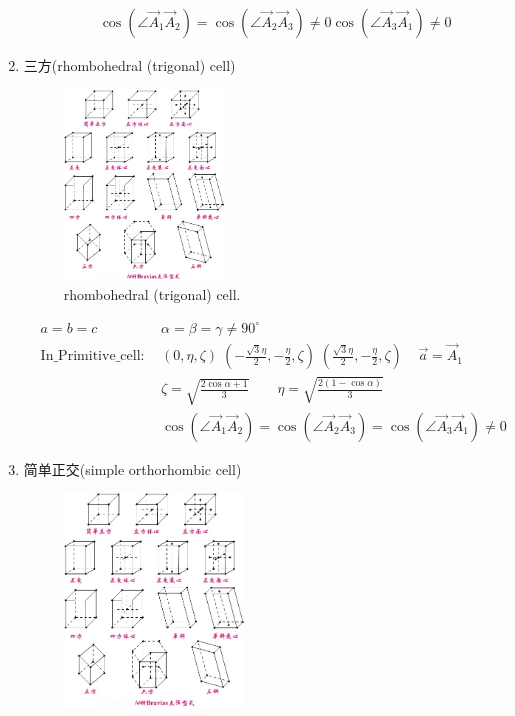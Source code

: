\documentclass{article}      %
\begin{document}
\begin{enumerate}
\begin{displaymath}
\begin{aligned}
		& &\cos(\angle\vec A_1\vec A_2)=\cos(\angle\vec A_2\vec A_3)\neq0\cos(\angle\vec A_3\vec A_1)\neq0
	\end{aligned}
\end{displaymath}
		\item 三方(\textrm{rhombohedral (trigonal) cell})
\begin{figure}[h!]
\centering
\includegraphics[width=0.4\textwidth,viewport=30 30 150 185,clip]{Bravias.jpg}
\caption{\small rhombohedral (trigonal) cell.}%
\label{Bravais:rhombohedral cell}
\end{figure}
\begin{displaymath}
	\begin{aligned}
	& a=b=c &\alpha=\beta=\gamma\neq90^{\circ}\\
	&\mathrm{In\_Primitive\_cell}:~&(0,\eta,\zeta)\;(-\frac{\sqrt3\eta}2,-\frac{\eta}2,\zeta)\;(\frac{\sqrt3\eta}2,-\frac{\eta}2,\zeta)\;\;\;\;\vec a=\vec A_1\\
	&&\zeta=\sqrt{\frac{2\cos\alpha+1}3}\qquad \eta=\sqrt{\frac{2(1-\cos\alpha)}3}\\
		& & \cos(\angle\vec A_1\vec A_2)=\cos(\angle\vec A_2\vec A_3)=\cos(\angle\vec A_3\vec A_1)\neq 0
	\end{aligned}
\end{displaymath}
		\item 简单正交(\textrm{simple orthorhombic cell})
\begin{figure}[h!]
\centering
\includegraphics[width=0.45\textwidth,viewport=-30 330 120 460,clip]{Bravias.jpg}

\end{figure}
\end{enumerate}
\end{document}
